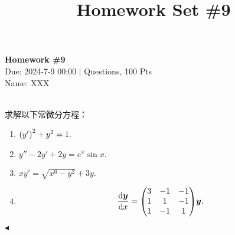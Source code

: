\documentclass[11pt]{article}
\title{Homework Set \#9}
\newenvironment{question}[2][Question]{\begin{trivlist}
\item[\hskip \labelsep {\bfseries #1}\hskip \labelsep {\bfseries #2.}]}{\hfill$\blacktriangleleft$\end{trivlist}}
\begin{document}
    \pagestyle{fancy}
    \chead{}

    \begin{center}
        {\LARGE \bf Homework \#9}\\
        {Due: 2024-7-9 00:00 \quad$|$ Questions, 100 Pts}\\
        {Name: XXX}
    \end{center}
    
    \begin{question}{1 (20') (常微分方程)}~\\
    求解以下常微分方程：
    \begin{enumerate}
        \item [a (5')] $\qty(y')^2 + y^2 = 1.$
        \item [b (5')] $y'' - 2y' + 2y = e^x \sin{x}.$
        \item [c (5')] $xy' = \sqrt{x^6 - y^2} + 3y.$ 
        \item [d (5')]
        \[ \dv{\vb*{y}}{x} = \mqty( 3 & -1 & -1 \\ 1 & 1 & -1 \\ 1 & -1 & 1 ) \vb*{y}. \]
    \end{enumerate}
    
    \end{question}
\end{document}
